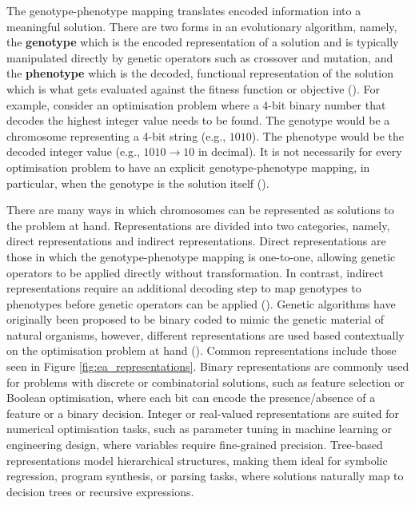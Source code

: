 \noindent The genotype-phenotype mapping translates encoded information into a meaningful solution. There are two forms in an evolutionary algorithm, namely, the \textbf{genotype} which is the encoded representation of a solution and is typically manipulated directly by genetic operators such as crossover and mutation, and the \textbf{phenotype} which is the decoded, functional representation of the solution which is what gets evaluated against the fitness function or objective (\cite{okramergeneticalgorithms}). For example, consider an optimisation problem where a 4-bit binary number that decodes the highest integer value needs to be found. The genotype would be a chromosome representing a 4-bit string (e.g., $1010$). The phenotype would be the decoded integer value (e.g., $1010 \rightarrow 10$ in decimal). It is not necessarily for every optimisation problem to have an explicit genotype-phenotype mapping, in particular, when the genotype is the solution itself (\cite{okramergeneticalgorithms}). \bigskip

\noindent There are many ways in which chromosomes can be represented as solutions to the problem at hand. Representations are divided into two categories, namely, direct representations and indirect representations. Direct representations are those in which the genotype-phenotype mapping is one-to-one, allowing genetic operators to be applied directly without transformation. In contrast, indirect representations require an additional decoding step to map genotypes to phenotypes before genetic operators can be applied (\cite{rothlauf2009representations}). Genetic algorithms have originally been proposed to be binary coded to mimic the genetic material of natural organisms, however, different representations are used based contextually on the optimisation problem at hand (\cite{yu2010introduction}). Common representations include those seen in Figure \ref{fig:ea_representations}. Binary representations are commonly used for problems with discrete or combinatorial solutions, such as feature selection or Boolean optimisation, where each bit can encode the presence/absence of a feature or a binary decision. Integer or real-valued representations are suited for numerical optimisation tasks, such as parameter tuning in machine learning or engineering design, where variables require fine-grained precision. Tree-based representations model hierarchical structures, making them ideal for symbolic regression, program synthesis, or parsing tasks, where solutions naturally map to decision trees or recursive expressions.

